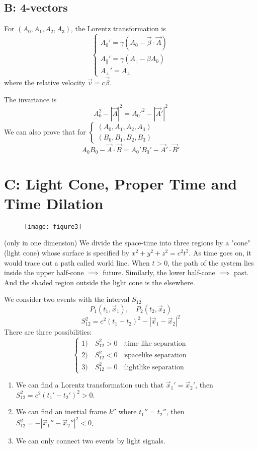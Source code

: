 \documentclass{article}
\begin{document}
	\subsection*{B: 4-vectors}
	For $(A_0, A_1, A_2, A_3)$, the Lorentz transformation is
	\[
	\begin{cases}
		A_0' = \gamma(A_0 - \vec{\beta} \cdot \vec{A}) \\
		A_{\parallel}' = \gamma(A_{\parallel} - \beta A_0) \\
		A_{\perp}' = A_{\perp}
	\end{cases}
	\]
	where the relative velocity $\vec{v} = c\vec{\beta}$.
	
	The invariance is
	\[
	A_0^2 - |\vec{A}|^2 = A_0'^2 - |\vec{A}'|^2
	\]
	We can also prove that for $\begin{cases} (A_0, A_1, A_2, A_3) \\ (B_0, B_1, B_2, B_3) \end{cases}$
	\[
	A_0 B_0 - \vec{A} \cdot \vec{B} = A_0' B_0' - \vec{A}' \cdot \vec{B}'
	\]
	
	\section*{C: Light Cone, Proper Time and Time Dilation}
	
	\begin{figure}[h]
		\centering
		\texttt{[image: figure3]}
		\caption{}
		\label{fig:figure3}
	\end{figure}
	
	(only in one dimension)
	We divide the space-time into three regions by a "cone" (light cone) whose surface is specified by $x^2 + y^2 + z^2 = c^2 t^2$.
	As time goes on, it would trace out a path called world line.
	When $t > 0$, the path of the system lies inside the upper half-cone $\implies$ future.
	Similarly, the lower half-cone $\implies$ past.
	And the shaded region outside the light cone is the elsewhere.
	
	We consider two events with the interval $S_{12}$
	\[ P_1(t_1, \vec{x}_1), \quad P_2(t_2, \vec{x}_2) \]
	\[ S_{12}^2 = c^2(t_1 - t_2)^2 - |\vec{x}_1 - \vec{x}_2|^2 \]
	There are three possibilities:
	\[
	\begin{cases}
		1) \quad S_{12}^2 > 0 & : \text{time like separation} \\
		2) \quad S_{12}^2 < 0 & : \text{spacelike separation} \\
		3) \quad S_{12}^2 = 0 & : \text{lightlike separation}
	\end{cases}
	\]
	\begin{enumerate}
		\item We can find a Lorentz transformation such that $\vec{x}_1' = \vec{x}_2'$, then $S_{12}^2 = c^2(t_1' - t_2')^2 > 0$.
		\item We can find an inertial frame $k''$ where $t_1'' = t_2''$, then $S_{12}^2 = -|\vec{x}_1'' - \vec{x}_2''|^2 < 0$.
		\item We can only connect two events by light signals.
	\end{enumerate}
	
\end{document}
